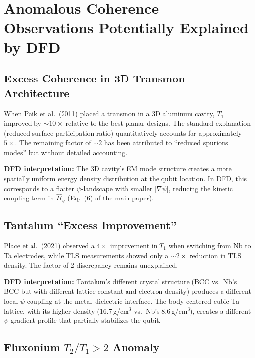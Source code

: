 \documentclass[11pt,letterpaper]{article}
\begin{document}
\section{Anomalous Coherence Observations Potentially Explained by DFD}

\subsection{Excess Coherence in 3D Transmon Architecture}

When Paik et al.\ (2011) placed a transmon in a 3D aluminum cavity, $T_1$
improved by $\sim 10\times$ relative to the best planar designs. The
standard explanation (reduced surface participation ratio) quantitatively
accounts for approximately $5\times$. The remaining factor of $\sim 2$
has been attributed to ``reduced spurious modes'' but without detailed
accounting.

\textbf{DFD interpretation:} The 3D cavity's EM mode structure creates a
more spatially uniform energy density distribution at the qubit location.
In DFD, this corresponds to a flatter $\psi$-landscape with smaller
$|\nabla\psi|$, reducing the kinetic coupling term in $\hat{H}_\psi$
(Eq.~(6) of the main paper).

\subsection{Tantalum ``Excess Improvement''}

Place et al.\ (2021) observed a $4\times$ improvement in $T_1$ when
switching from Nb to Ta electrodes, while TLS measurements showed only a
$\sim 2\times$ reduction in TLS density. The factor-of-2 discrepancy
remains unexplained.

\textbf{DFD interpretation:} Tantalum's different crystal structure
(BCC vs.\ Nb's BCC but with different lattice constant and electron
density) produces a different local $\psi$-coupling at the
metal--dielectric interface. The body-centered cubic Ta lattice, with its
higher density ($16.7$\,g/cm$^3$ vs.\ Nb's $8.6$\,g/cm$^3$), creates
a different $\psi$-gradient profile that partially stabilizes the qubit.

\subsection{Fluxonium $T_2/T_1 > 2$ Anomaly}
\end{document}
